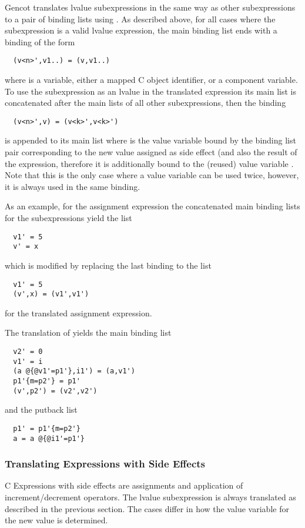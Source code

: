 Gencot translates lvalue subexpressions in the same way as other subexpressions to a pair of binding lists using .
As described above, for all cases where the subexpression is a valid lvalue expression, the main binding list ends with a binding
of the form
\begin{verbatim}
  (v<n>',v1..) = (v,v1..)
\end{verbatim}
where  is a variable, either a mapped C object identifier, or a component variable. To use the subexpression as an lvalue
in the translated expression its main list is concatenated after the main lists of all other subexpressions, then the binding
\begin{verbatim}
  (v<n>',v) = (v<k>',v<k>')
\end{verbatim}
is appended to its main list
where  is the value variable bound by the binding list pair corresponding to the new value assigned as side effect
(and also the result of the expression, therefore it is additionally bound to the (reused) value variable . 
Note that this is the only case where a value variable can be used twice, however, it is always used in the same binding.

As an example, for the assignment expression  the concatenated main binding lists for the subexpressions yield the
list 
\begin{verbatim}
  v1' = 5
  v' = x
\end{verbatim}
which is modified by replacing the last binding to the list
\begin{verbatim}
  v1' = 5
  (v',x) = (v1',v1')
\end{verbatim}
for the translated assignment expression.

The translation of  yields the main binding list
\begin{verbatim}
  v2' = 0
  v1' = i
  (a @{@v1'=p1'},i1') = (a,v1')
  p1'{m=p2'} = p1'
  (v',p2') = (v2',v2')
\end{verbatim}
and the putback list
\begin{verbatim}
  p1' = p1'{m=p2'}
  a = a @{@i1'=p1'}
\end{verbatim}

\subsubsection{Translating Expressions with Side Effects}

C Expressions with side effects are assignments and application of increment/decrement operators. The lvalue subexpression is always 
translated as described in the previous section. The cases differ in how the value variable  for the new value is 
determined.

